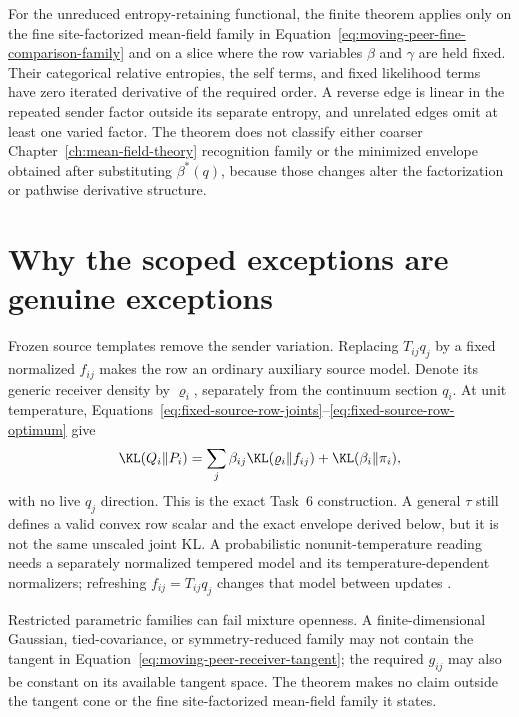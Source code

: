 For the unreduced entropy-retaining functional, the finite theorem applies only on the fine site-factorized mean-field family in Equation~\eqref{eq:moving-peer-fine-comparison-family} and on a slice where the row variables \(\beta\) and \(\gamma\) are held fixed. Their categorical relative entropies, the self terms, and fixed likelihood terms have zero iterated derivative of the required order. A reverse edge is linear in the repeated sender factor outside its separate entropy, and unrelated edges omit at least one varied factor. The theorem does not classify either coarser Chapter~\ref{ch:mean-field-theory} recognition family or the minimized envelope obtained after substituting \(\beta^*(q)\), because those changes alter the factorization or pathwise derivative structure.

\section{Why the scoped exceptions are genuine exceptions}

\begin{samepage}
Frozen source templates remove the sender variation. Replacing \(T_{ij}q_j\) by a fixed normalized \(f_{ij}\) makes the row an ordinary auxiliary source model. Denote its generic receiver density by \(\varrho_i\), separately from the continuum section \(q_i\). At unit temperature, Equations~\eqref{eq:fixed-source-row-joints}--\eqref{eq:fixed-source-row-optimum} give
\begin{equation}
\KL(Q_i\Vert P_i)
=\sum_j\beta_{ij}\KL(\varrho_i\Vert f_{ij})
+\KL(\beta_i\Vert\pi_i),
\label{eq:pifb2-unit-temperature-frozen-row}
\end{equation}
with no live \(q_j\) direction. This is the exact Task~6 construction. A general \(\tau\) still defines a valid convex row scalar and the exact envelope derived below, but it is not the same unscaled joint KL. A probabilistic nonunit-temperature reading needs a separately normalized tempered model and its temperature-dependent normalizers; refreshing \(f_{ij}=T_{ij}q_j\) changes that model between updates \citep{BissiriHolmesWalker2016}.
\end{samepage}

Restricted parametric families can fail mixture openness. A finite-dimensional Gaussian, tied-covariance, or symmetry-reduced family may not contain the tangent in Equation~\eqref{eq:moving-peer-receiver-tangent}; the required \(g_{ij}\) may also be constant on its available tangent space. The theorem makes no claim outside the tangent cone or the fine site-factorized mean-field family it states.

